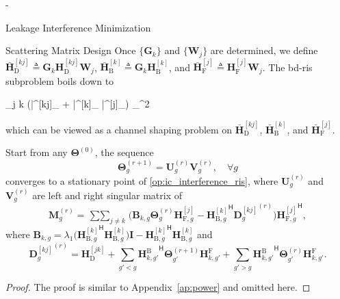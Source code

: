 \begin{section}{-}
\begin{subsection}{Leakage Interference Minimization}
		\begin{subsubsection}{Scattering Matrix Design}
			Once $\{\mathbf{G}_k\}$ and $\{\mathbf{W}_j\}$ are determined, we define $\bar{\mathbf{H}}^{[kj]}_\mathrm{D} \triangleq \mathbf{G}_k \mathbf{H}^{[kj]}_\mathrm{D} \mathbf{W}_j$, $\bar{\mathbf{H}}^{[k]}_\mathrm{B} \triangleq \mathbf{G}_k \mathbf{H}^{[k]}_\mathrm{B}$, and $\bar{\mathbf{H}}^{[j]}_\mathrm{F} \triangleq \mathbf{H}^{[j]}_\mathrm{F} \mathbf{W}_j$.
			The \gls{bd}-\gls{ris} subproblem boils down to
			\begin{mini!}
				{\scriptstyle{\mathbf{\Theta}}}{\mathop{\sum\sum}_{j \neq k} \left\lVert (\bar{}^{[kj]}_ + \bar{}^{[k]}_ \mathbf{\Theta} \bar{}^{[j]}_) \right\rVert _{}^2}{\label{op:ic_interference_ris}}{}
			\end{mini!}
			which can be viewed as a channel shaping problem on $\bar{\mathbf{H}}^{[kj]}_\mathrm{D}$, $\bar{\mathbf{H}}^{[k]}_\mathrm{B}$, and $\bar{\mathbf{H}}^{[j]}_\mathrm{F}$.

			\begin{proposition}
				Start from any $\mathbf{\Theta}^{(0)}$, the sequence
				\begin{equation}
					\mathbf{\Theta}_g^{(r+1)} = \mathbf{U}_g^{(r)} \mathbf{V}_g^{(r)}, \quad \forall g
					\label{eq:scatter_leakage}
				\end{equation}
				converges to a stationary point of \eqref{op:ic_interference_ris}, where $\mathbf{U}_g^{(r)}$ and $\mathbf{V}_g^{(r)}$ are left and right singular matrix of
				\begin{equation}
					\mathbf{M}_g^{(r)} = \mathop{\sum\sum}_{j \neq k} \bigl(\mathbf{B}_{k,g} \mathbf{\Theta}_g^{(r)} \mathbf{H}^{[j]}_{\mathrm{F},g} - {\mathbf{H}^{[k]}_{\mathrm{B},g}}^\mathsf{H} {\mathbf{D}^{[kj]}_{g}}^{(r)}\bigr) {\mathbf{H}^{[j]}_{\mathrm{F},g}}^\mathsf{H},
				\end{equation}
				where $\mathbf{B}_{k,g} = \lambda_1\bigl({\mathbf{H}^{[k]}_{\mathrm{B},g}}^\mathsf{H} \mathbf{H}^{[k]}_{\mathrm{B},g}\bigr) \mathbf{I} - {\mathbf{H}^{[k]}_{\mathrm{B},g}}^\mathsf{H} \mathbf{H}^{[k]}_{\mathrm{B},g}$ and
				\begin{equation}
					{\mathbf{D}^{[kj]}_{g}}^{(r)} = \mathbf{H}^{[jk]}_\mathrm{D} + \sum_{g'<g} {\mathbf{H}_{k,g'}^\mathrm{B}}^\mathsf{H} \mathbf{\Theta}_{g'}^{(r+1)} \mathbf{H}_{k,g'}^\mathrm{F} + \sum_{g'>g} {\mathbf{H}_{k,g'}^\mathrm{B}}^\mathsf{H} \mathbf{\Theta}_{g'}^{(r)} \mathbf{H}_{k,g'}^\mathrm{F}.
				\end{equation}
			\end{proposition}
			\begin{proof}
				The proof is similar to Appendix~\ref{ap:power} and omitted here.
			\end{proof}
		\end{subsubsection}


\end{subsection}
\end{section}
